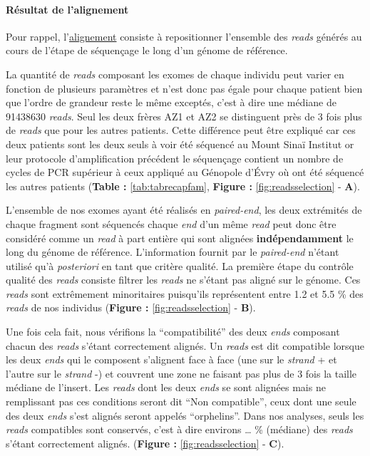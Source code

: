 \documentclass[12pt,twoside]{reedthesis}
\theoremstyle{definition}
\theoremstyle{definition}
\theoremstyle{remark}
\begin{document}
  \paragraph{Résultat de l'alignement}\label{resultat-de-lalignement}
  
  Pour rappel, l'\href{\%7B\#lalignement\%7D}{alignement} consiste à
  repositionner l'ensemble des \emph{reads} générés au cours de l'étape de
  séquençage le long d'un génome de référence.
  
  La quantité de \emph{reads} composant les exomes de chaque individu peut
  varier en fonction de plusieurs paramètres et n'est donc pas égale pour
  chaque patient bien que l'ordre de grandeur reste le même exceptés,
  c'est à dire une médiane de 91438630 \emph{reads}. Seul les deux frères
  AZ1 et AZ2 se distinguent près de 3 fois plus de \emph{reads} que pour
  les autres patients. Cette différence peut être expliqué car ces deux
  patients sont les deux seuls à voir été séquencé au Mount Sinaï Institut
  or leur protocole d'amplification précédent le séquençage contient un
  nombre de cycles de PCR supérieur à ceux appliqué au Génopole d'Évry où
  ont été séquencé les autres patients (\textbf{Table :}
  \ref{tab:tabrecapfam}, \textbf{Figure : }\ref{fig:readsselection} -
  \textbf{A}).
  
  L'ensemble de nos exomes ayant été réalisés en \emph{paired-end}, les
  deux extrémités de chaque fragment sont séquencés chaque \emph{end} d'un
  même \emph{read} peut donc être considéré comme un \emph{read} à part
  entière qui sont alignées \textbf{indépendamment} le long du génome de
  référence. L'information fournit par le \emph{paired-end} n'étant
  utilisé qu'à \emph{posteriori} en tant que critère qualité. La première
  étape du contrôle qualité des \emph{reads} consiste filtrer les
  \emph{reads} ne s'étant pas aligné sur le génome. Ces \emph{reads} sont
  extrêmement minoritaires puisqu'ils représentent entre 1.2 et 5.5 \% des
  \emph{reads} de nos individus (\textbf{Figure :
  }\ref{fig:readsselection} - \textbf{B}).
  
  Une fois cela fait, nous vérifions la ``compatibilité'' des deux
  \emph{ends} composant chacun des \emph{reads} s'étant correctement
  alignés. Un \emph{reads} est dit compatible lorsque les deux \emph{ends}
  qui le composent s'alignent face à face (une sur le \emph{strand} + et
  l'autre sur le \emph{strand} -) et couvrent une zone ne faisant pas plus
  de 3 fois la taille médiane de l'insert. Les \emph{reads} dont les deux
  \emph{ends} se sont alignées mais ne remplissant pas ces conditions
  seront dit ``Non compatible'', ceux dont une seule des deux \emph{ends}
  s'est alignés seront appelés ``orphelins''. Dans nos analyses, seuls les
  \emph{reads} compatibles sont conservés, c'est à dire environs \ldots{}
  \% (médiane) des \emph{reads} s'étant correctement alignés.
  (\textbf{Figure : }\ref{fig:readsselection} - \textbf{C}).
  
\end{document}
